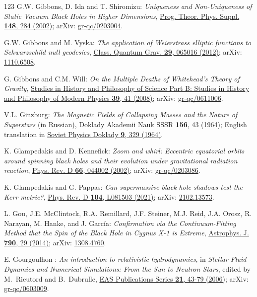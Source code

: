 \begin{thebibliography}{123}
G.W. Gibbons, D. Ida and T. Shiromizu:
{\em Uniqueness and Non-Uniqueness of Static Vacuum Black Holes in Higher Dimensions},
\href{https://doi.org/10.1143/PTPS.148.284}{Prog. Theor. Phys. Suppl. {\bf 148}, 284 (2002)};
arXiv: \href{https://arxiv.org/abs/gr-qc/0203004}{gr-qc/0203004}.

G.W. Gibbons and M. Vyska:
{\em The application of Weierstrass elliptic functions to Schwarzschild null geodesics},
\href{https://doi.org/10.1088/0264-9381/29/6/065016}{Class. Quantum Grav. {\bf 29}, 065016 (2012)};
arXiv: \href{https://arxiv.org/abs/1110.6508}{1110.6508}.

G. Gibbons and C.M. Will: {\em On the Multiple Deaths of Whitehead's Theory of Gravity},
\href{https://doi.org/10.1016/j.shpsb.2007.04.004}{Studies in History and Philosophy of Science Part B: Studies in History and Philosophy of Modern Physics {\bf 39}, 41 (2008)};
arXiv: \href{https://arxiv.org/abs/gr-qc/0611006}{gr-qc/0611006}.

V.L. Ginzburg:
{\em The Magnetic Fields of Collapsing Masses and the Nature of Superstars}
(in Russian),
Doklady Akademii Nauk SSSR {\bf 156}, 43 (1964); English translation in
\href{https://www.mathnet.ru/eng/dan/v156/i1/p43}{Soviet Physics Doklady {\bf 9}, 329 (1964)}.

K. Glampedakis and D. Kennefick:
{\em Zoom and whirl: Eccentric equatorial orbits around spinning black holes and their evolution under gravitational radiation reaction},
\href{https://doi.org/10.1103/PhysRevD.66.044002}{Phys. Rev. D {\bf 66}, 044002 (2002)};
arXiv: \href{https://arxiv.org/abs/gr-qc/0203086}{gr-qc/0203086}.

K. Glampedakis and G. Pappas:
{\em Can supermassive black hole shadows test the Kerr metric?},
\href{https://doi.org/10.1103/PhysRevD.104.L081503}{Phys. Rev. D {\bf 104}, L081503 (2021)};
arXiv: \href{https://arxiv.org/abs/2102.13573}{2102.13573}.

L. Gou, J.E. McClintock, R.A. Remillard, J.F. Steiner, M.J. Reid, J.A. Orosz, R. Narayan, M. Hanke, and J. García:
{\em Confirmation via the Continuum-Fitting Method that the Spin of the Black Hole in Cygnus X-1 is Extreme},
\href{https://doi.org/10.1088/0004-637X/790/1/29}{Astrophys. J. {\bf 790}, 29 (2014)};
arXiv: \href{https://arxiv.org/abs/1308.4760}{1308.4760}.

E. Gourgoulhon :
{\em  An introduction to relativistic hydrodynamics},
in {\em Stellar Fluid Dynamics and Numerical Simulations: From the Sun
to Neutron Stars}, edited by M.~Rieutord and B.~Dubrulle,
\href{https://doi.org/10.1051/eas:2006106}{EAS Publications Series {\bf 21}, 43-79 (2006)};
arXiv: \href{https://arxiv.org/abs/gr-qc/0603009}{gr-qc/0603009}.


\end{thebibliography}
